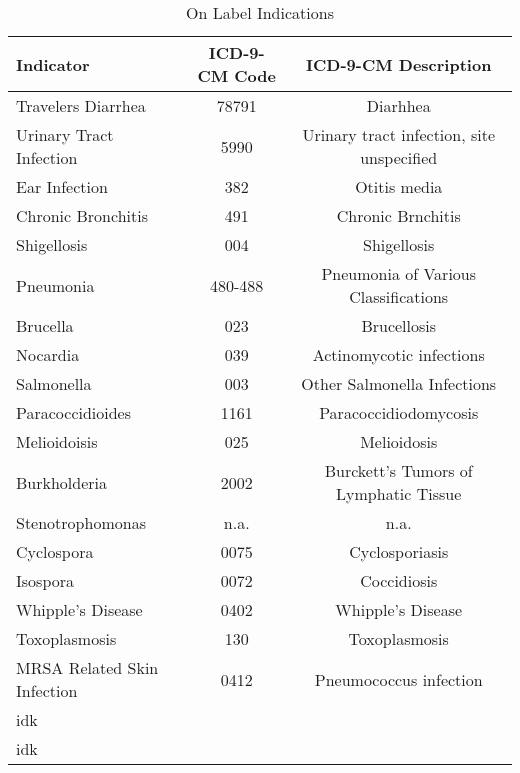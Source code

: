 \begin{table}[htbp]\centering
\def\sym#1{\ifmmode^{#1}\else\(^{#1}\)\fi}
\caption{On Label Indications\label{tab1}}
\begin{tabular}{l*{2}{c}}
\hline\hline
            Indicator&\multicolumn{1}{c}{ICD-9-CM Code}&\multicolumn{1}{c}{ICD-9-CM Description}\\
\hline
Travelers Diarrhea    &     78791&       Diarhhea\\
[1em]
Urinary Tract Infection    &     5990&       Urinary tract infection, site unspecified\\
[1em]
Ear Infection    &     382&       Otitis media\\
[1em]
Chronic Bronchitis    &     491&       Chronic Brnchitis\\
[1em]
Shigellosis    &     004&       Shigellosis\\
[1em]
Pneumonia    &     480-488&       Pneumonia of Various Classifications\\
[1em]
Brucella    &     023&       Brucellosis\\
[1em]
Nocardia    &     039&       Actinomycotic infections\\
[1em]
Salmonella    &     003&       Other Salmonella Infections\\
[1em]
Paracoccidioides    &     1161&       Paracoccidiodomycosis\\
[1em]
Melioidoisis    &     025&       Melioidosis\\
[1em]
Burkholderia    &     2002&       Burckett's Tumors of Lymphatic Tissue\\
[1em]
Stenotrophomonas    &     n.a.&       n.a.\\
[1em]
Cyclospora    &     0075&       Cyclosporiasis\\
[1em]
Isospora    &     0072&       Coccidiosis\\
[1em]
Whipple's Disease    &     0402&       Whipple's Disease\\
[1em]
Toxoplasmosis    &     130&       Toxoplasmosis\\
[1em]
MRSA Related Skin Infection    &     0412&       Pneumococcus infection\\
\hline
idk\\
idk\\
\hline\hline
\end{tabular}
\label{tab:Table4.1}
\end{table}
